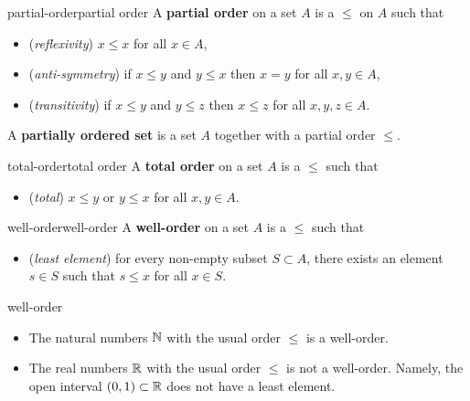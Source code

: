 \begin{topic}{partial-order}{partial order}
    A \textbf{partial order} on a set $A$ is a  $\le$ on $A$ such that
    \begin{itemize}
        \item (\textit{reflexivity}) $x \le x$ for all $x \in A$,
        \item (\textit{anti-symmetry}) if $x \le y$ and $y \le x$ then $x = y$ for all $x, y \in A$,
        \item (\textit{transitivity}) if $x \le y$ and $y \le z$ then $x \le z$ for all $x, y, z \in A$.
    \end{itemize}
    A \textbf{partially ordered set} is a set $A$ together with a partial order $\le$.
\end{topic}

\begin{topic}{total-order}{total order}
    A \textbf{total order} on a set $A$ is a  $\le$ such that
    \begin{itemize}
        \item (\textit{total}) $x \le y$ or $y \le x$ for all $x, y \in A$.
    \end{itemize}
\end{topic}

\begin{topic}{well-order}{well-order}
    A \textbf{well-order} on a set $A$ is a  $\le$ such that
    \begin{itemize}
        \item (\textit{least element}) for every non-empty subset $S \subset A$, there exists an element $s \in S$ such that $s \le x$ for all $x \in S$.
    \end{itemize}
\end{topic}

\begin{example}{well-order}
    \begin{itemize}
        \item The natural numbers $\mathbb{N}$ with the usual order $\le$ is a well-order.
        \item The real numbers $\mathbb{R}$ with the usual order $\le$ is not a well-order. Namely, the open interval $(0, 1) \subset \mathbb{R}$ does not have a least element.
    \end{itemize}
\end{example}

